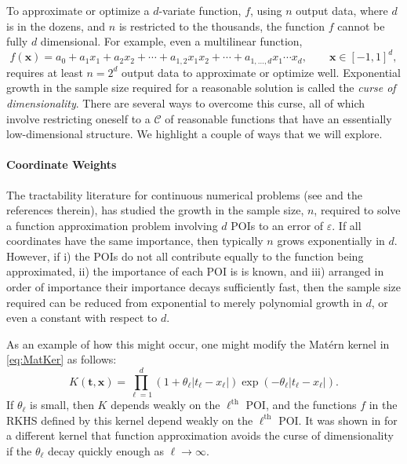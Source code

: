 \documentclass[11pt]{NSFamsart}
\newcommand{\bx}{{\boldsymbol{x}}}
\newcommand{\bt}{{\boldsymbol{t}}}
\newcommand{\calc}{{\mathcal{C}}}
\def\abs#1{\ensuremath{\left \lvert #1 \right \rvert}}
\begin{document}
To approximate or optimize a $d$-variate function, $f$, using $n$ output data, where $d$ is in the dozens, and $n$ is restricted to the thousands, the function $f$ cannot be fully $d$ dimensional.  For example, even a multilinear function,
\begin{equation*}
    f(\bx) = a_0 + a_1 x_1 + a_2 x_2 + \cdots + a_{1,2} x_1 x_2 + \cdots + a_{1,\ldots, d}x_1 \cdots x_d, \qquad \bx \in [-1,1]^d,
\end{equation*}
requires at least $n = 2^d$ output data to approximate or optimize well.  Exponential growth in the sample size required for a reasonable solution is called the \emph{curse of dimensionality}.  There are several ways to overcome this curse, all of which involve restricting oneself to a $\calc$ of reasonable functions that have an essentially low-dimensional structure.  We highlight a couple of ways that we will explore.

\paragraph*{Coordinate Weights}
The tractability literature for continuous numerical problems (see \cite{DicEtal14a,NovWoz08a, NovWoz10a, NovWoz12a} and the references therein), has studied the growth in the sample size, $n$, required to solve a function approximation problem involving $d$ POIs to an error of $\varepsilon$.  If all coordinates have the same importance, then typically $n$ grows exponentially in $d$. However, if i) the POIs do not all contribute equally to the function being approximated, ii) the importance of each POI is is known, and iii) arranged in order of importance their importance decays sufficiently fast, then the sample size required can be reduced from exponential to merely polynomial growth in $d$, or even a constant with respect to $d$.

As an example of how this might occur, one might modify the Mat\'ern kernel in \eqref{eq:MatKer} as follows:
\begin{equation} \label{eq:ProdMatKer}
    K(\bt,\bx) = \prod_{\ell = 1}^d (1 + \theta_\ell \abs{t_\ell-x_\ell}) \exp(-\theta_\ell \abs{t_\ell-x_\ell}).
\end{equation}
If $\theta_\ell$ is small, then $K$ depends weakly on the $\ell^{\text{th}}$ POI, and the functions $f$ in the RKHS defined by this kernel depend weakly on the $\ell^{\text{th}}$ POI.  It was shown in \cite{FasHicWoz12b, FasHicWoz12a} for a different kernel that function approximation avoids the curse of dimensionality if the $\theta_\ell$ decay quickly enough as $\ell \to \infty$.
\end{document}
